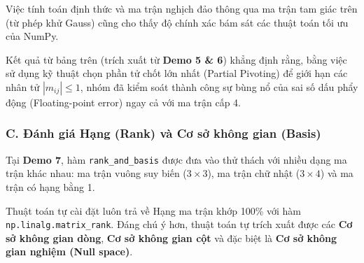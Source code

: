Việc tính toán định thức và ma trận nghịch đảo thông qua ma trận tam giác trên (từ phép khử Gauss) cũng cho thấy độ chính xác bám sát các thuật toán tối ưu của NumPy.

\begin{table}[H]
    \centering
    \caption{Bảng đối chiếu sai số Định thức và Ma trận nghịch đảo}
    \vspace{0.2cm}
    \renewcommand{\arraystretch}{1.3}
\end{table}

Kết quả từ bảng trên (trích xuất từ \textbf{Demo 5 \& 6}) khẳng định rằng, bằng việc sử dụng kỹ thuật chọn phần tử chốt lớn nhất (Partial Pivoting) để giới hạn các nhân tử $|m_{ij}| \le 1$, nhóm đã kiểm soát thành công sự bùng nổ của sai số dấu phẩy động (Floating-point error) ngay cả với ma trận cấp 4.

\subsubsection*{C. Đánh giá Hạng (Rank) và Cơ sở không gian (Basis)}

Tại \textbf{Demo 7}, hàm \texttt{rank\_and\_basis} được đưa vào thử thách với nhiều dạng ma trận khác nhau: ma trận vuông suy biến ($3 \times 3$), ma trận chữ nhật ($3 \times 4$) và ma trận có hạng bằng 1.

Thuật toán tự cài đặt luôn trả về Hạng ma trận khớp 100\% với hàm \texttt{np.linalg.matrix\_rank}. Đáng chú ý hơn, thuật toán tự trích xuất được các \textbf{Cơ sở không gian dòng}, \textbf{Cơ sở không gian cột} và đặc biệt là \textbf{Cơ sở không gian nghiệm (Null space)}. 

